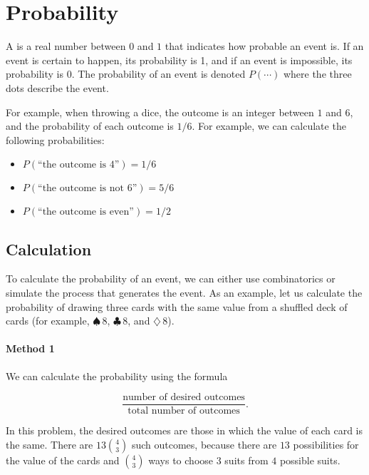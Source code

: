 \chapter{Probability}


A  is a real number between $0$ and $1$
that indicates how probable an event is.
If an event is certain to happen,
its probability is 1,
and if an event is impossible,
its probability is 0.
The probability of an event is denoted $P(\cdots)$
where the three dots describe the event.

For example, when throwing a dice,
the outcome is an integer between $1$ and $6$,
and the probability of each outcome is $1/6$.
For example, we can calculate the following probabilities:

\begin{itemize}[noitemsep]
    \item $P(\textrm{``the outcome is 4''})=1/6$
    \item $P(\textrm{``the outcome is not 6''})=5/6$
    \item $P(\textrm{``the outcome is even''})=1/2$
\end{itemize}

\section{Calculation}

To calculate the probability of an event,
we can either use combinatorics
or simulate the process that generates the event.
As an example, let us calculate the probability
of drawing three cards with the same value
from a shuffled deck of cards
(for example, $\spadesuit\,8$, $\clubsuit\,8$, and $\diamondsuit\,8$).

\subsubsection*{Method 1}

We can calculate the probability using the formula

\[\frac{\textrm{number of desired outcomes}}{\textrm{total number of outcomes}}.\]

In this problem, the desired outcomes are those
in which the value of each card is the same.
There are $13 \binom{4}{3}$ such outcomes,
because there are $13$ possibilities for the
value of the cards and $\binom{4}{3}$ ways to
choose $3$ suits from $4$ possible suits.

